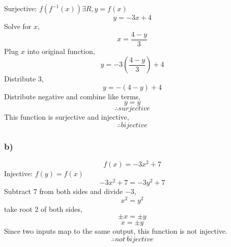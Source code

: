 \documentclass[journal]{IEEEtran}
\begin{document}
        Surjective: $f(f^{-1}(x)) \exists R, y = f(x)$
        \begin{equation}
            y = -3x + 4
        \end{equation}
        Solve for $x$,
        \begin{equation}
            x = \frac{4-y}{3}
        \end{equation}
        Plug $x$ into original function,
        \begin{equation}
            y = -3(\frac{4-y}{3}) + 4
        \end{equation}
        Distribute 3,
        \begin{equation}
            y = -(4-y) + 4
        \end{equation}
        Distribute negative and combine like terms,
        \begin{equation}
            y = y
        \end{equation}
        $$\therefore surjective$$
        This function is surjective and injective,
        $$\boxed{\therefore bijective}$$

    \subsubsection*{b)}
        \begin{equation}
            f(x) = -3x^2 + 7
        \end{equation}
        Injective: $f(y) = f(x)$
        \begin{equation}
            -3x^2 + 7 = -3y^2 + 7
        \end{equation}
        Subtract $7$ from both sides and divide $-3$,
        \begin{equation}
            x^2 = y^2
        \end{equation}
        take root $2$ of both sides,
        \begin{equation}
            \pm x = \pm y
        \end{equation}
        \begin{equation}
            x = \pm y
        \end{equation}
        Since two inputs map to the same output, this function is not injective.
        $$\boxed{\therefore not~bijective}$$
\end{document}
